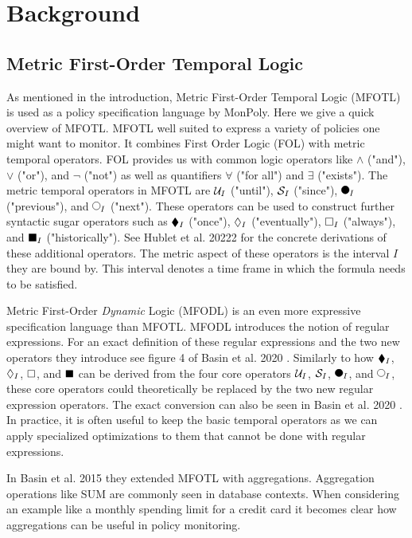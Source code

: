 \section{Background}

\subsection{Metric First-Order Temporal Logic}
As mentioned in the introduction, Metric First-Order Temporal Logic (MFOTL) \cite{Basin2008, Basin2015, Chomicki1995} is used as a policy specification language by MonPoly.
Here we give a quick overview of MFOTL.
MFOTL well suited to express a variety of policies one might want to monitor.
It combines First Order Logic (FOL) with metric temporal operators.
FOL provides us with common logic operators like $\land$ ("and"), $\lor$ ("or"), and $\neg$ ("not") as well as quantifiers $\forall$ ("for all") and $\exists$ ("exists").
The metric temporal operators in MFOTL are $\mathcal{U}_I$ ("until"), $\mathcal{S}_I$ ("since"), $\Previous_I$ ("previous"), and $\Next_I$ ("next").
These operators can be used to construct further syntactic sugar operators such as $\blacklozenge_I$ ("once"), $\lozenge_I$ ("eventually"), $\square_I$ ("always"), and $\blacksquare_I$ ("historically").
See Hublet et al. 20222 \cite{Hublet2022} for the concrete derivations of these additional operators.
The metric aspect of these operators is the interval $I$ they are bound by.
This interval denotes a time frame in which the formula needs to be satisfied.

Metric First-Order \textit{Dynamic} Logic (MFODL) \cite{Basin2020} is an even more expressive specification language than MFOTL.
MFODL introduces the notion of regular expressions.
For an exact definition of these regular expressions and the two new operators they introduce see figure 4 of Basin et al. 2020 \cite{Basin2020}.
Similarly to how $\blacklozenge_I$, $\lozenge_I$, $\square$, and $\blacksquare$ can be derived from the four core operators $\mathcal{U}_I$, $\mathcal{S}_I$, $\Previous_I$, and $\Next_I$, these core operators could theoretically be replaced by the two new regular expression operators.
The exact conversion can also be seen in Basin et al. 2020 \cite{Basin2020}.
In practice, it is often useful to keep the basic temporal operators as we can apply specialized optimizations to them that cannot be done with regular expressions.

In Basin et al. 2015 \cite{Basin2015aggregations} they extended MFOTL with aggregations.
Aggregation operations like SUM are commonly seen in database contexts.
When considering an example like a monthly spending limit for a credit card it becomes clear how aggregations can be useful in policy monitoring.


